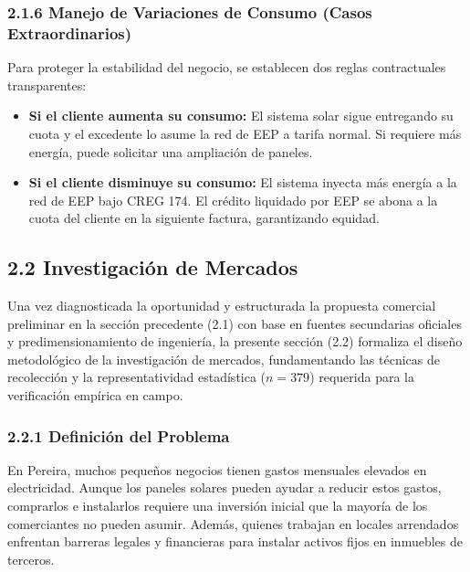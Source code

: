\documentclass[12pt,letterpaper]{article}
\begin{document}
\subsubsection{2.1.6 Manejo de Variaciones de Consumo (Casos Extraordinarios)}

Para proteger la estabilidad del negocio, se establecen dos reglas contractuales transparentes:
\begin{itemize}[leftmargin=1.5em, itemsep=2pt]
    \item \textbf{Si el cliente aumenta su consumo:} El sistema solar sigue entregando su cuota y el excedente lo asume la red de EEP a tarifa normal. Si requiere más energía, puede solicitar una ampliación de paneles.
    \item \textbf{Si el cliente disminuye su consumo:} El sistema inyecta más energía a la red de EEP bajo CREG 174. El crédito liquidado por EEP se abona a la cuota del cliente en la siguiente factura, garantizando equidad.
\end{itemize}

\vspace{0.4cm}

\subsection{2.2 Investigación de Mercados}

Una vez diagnosticada la oportunidad y estructurada la propuesta comercial preliminar en la sección precedente (2.1) con base en fuentes secundarias oficiales y predimensionamiento de ingeniería, la presente sección (2.2) formaliza el diseño metodológico de la investigación de mercados, fundamentando las técnicas de recolección y la representatividad estadística ($n = 379$) requerida para la verificación empírica en campo.

\subsubsection{2.2.1 Definición del Problema}

En Pereira, muchos pequeños negocios tienen gastos mensuales elevados en electricidad. Aunque los paneles solares pueden ayudar a reducir estos gastos, comprarlos e instalarlos requiere una inversión inicial que la mayoría de los comerciantes no pueden asumir. Además, quienes trabajan en locales arrendados enfrentan barreras legales y financieras para instalar activos fijos en inmuebles de terceros.
\end{document}
